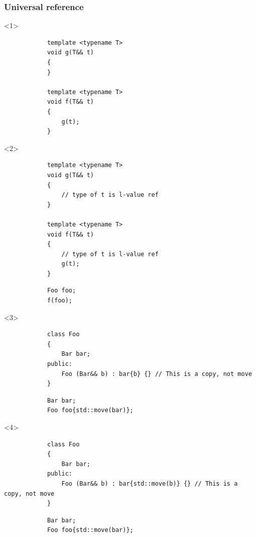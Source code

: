 \documentclass{beamer}
\begin{document}
\begin{frame}[fragile,t]
\frametitle{Universal reference}
    \begin{onlyenv}<1>
        \begin{lstlisting}
            template <typename T>
            void g(T&& t)
            {
            }

            template <typename T>
            void f(T&& t)
            {
                g(t);
            }
        \end{lstlisting}
    \end{onlyenv}
    \begin{onlyenv}<2>
        \begin{lstlisting}
            template <typename T>
            void g(T&& t)
            {
                // type of t is l-value ref
            }

            template <typename T>
            void f(T&& t)
            {
                // type of t is l-value ref
                g(t);
            }
        \end{lstlisting}

        \hrulefill
        \begin{lstlisting}
            Foo foo;
            f(foo);
        \end{lstlisting}
    \end{onlyenv}

    \begin{onlyenv}<3>
        \begin{lstlisting}
            class Foo
            {
                Bar bar;
            public:
                Foo (Bar&& b) : bar{b} {} // This is a copy, not move
            }
        \end{lstlisting}

        \hrulefill
        \begin{lstlisting}
            Bar bar;
            Foo foo{std::move(bar)};
        \end{lstlisting}
    \end{onlyenv}

    \begin{onlyenv}<4>
        \begin{lstlisting}
            class Foo
            {
                Bar bar;
            public:
                Foo (Bar&& b) : bar{std::move(b)} {} // This is a copy, not move
            }
        \end{lstlisting}

        \hrulefill
        \begin{lstlisting}
            Bar bar;
            Foo foo{std::move(bar)};
        \end{lstlisting}
    \end{onlyenv}
    

\end{frame}
\end{document}
